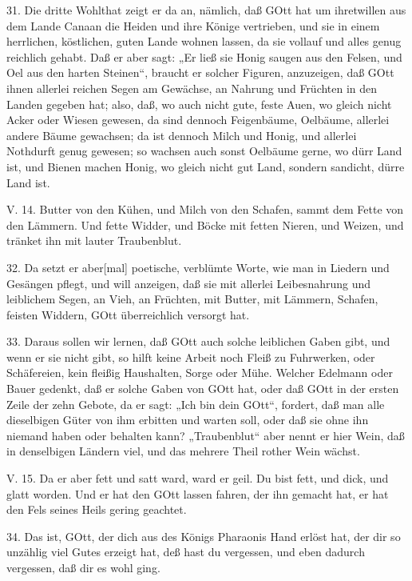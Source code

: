 31. Die dritte Wohlthat zeigt er da an, nämlich, daß GOtt hat um ihretwillen aus dem Lande Canaan die Heiden und ihre Könige vertrieben, und sie in einem herrlichen, köstlichen, guten Lande wohnen lassen, da sie vollauf und alles genug reichlich gehabt. Daß er aber sagt: „Er ließ sie Honig saugen aus den Felsen, und Oel aus den harten Steinen“, braucht er solcher Figuren, anzuzeigen, daß GOtt ihnen allerlei reichen Segen am Gewächse, an Nahrung und Früchten in den Landen gegeben hat; also, daß, wo auch nicht gute, feste Auen, wo gleich nicht Acker oder Wiesen gewesen, da sind dennoch Feigenbäume, Oelbäume, allerlei andere Bäume gewachsen; da ist dennoch Milch und Honig, und allerlei Nothdurft genug gewesen; so wachsen auch sonst Oelbäume gerne, wo dürr Land ist, und Bienen machen Honig, wo gleich nicht gut Land, sondern sandicht, dürre Land ist.

\begin{schriftzitat}
V. 14. Butter von den Kühen, und Milch von den Schafen, sammt dem Fette von den Lämmern. Und fette Widder, und Böcke mit fetten Nieren, und Weizen, und tränket ihn mit lauter Traubenblut.
\end{schriftzitat}

32. Da setzt er aber[mal] poetische, verblümte Worte, wie man in Liedern und Gesängen pflegt, und will anzeigen, daß sie mit allerlei Leibesnahrung
und leiblichem Segen, an Vieh, an Früchten, mit Butter, mit Lämmern, Schafen, feisten Widdern, GOtt überreichlich versorgt hat.

33. Daraus sollen wir lernen, daß GOtt auch solche leiblichen Gaben gibt, und wenn er sie nicht gibt, so hilft keine Arbeit noch Fleiß zu Fuhrwerken, oder Schäfereien, kein fleißig Haushalten, Sorge oder Mühe. Welcher Edelmann oder Bauer gedenkt, daß er solche Gaben von GOtt hat, oder daß GOtt in der ersten Zeile der zehn Gebote, da er sagt: „Ich bin dein GOtt“, fordert, daß man alle dieselbigen Güter von ihm erbitten und warten soll, oder daß sie ohne ihn niemand haben oder behalten kann? „Traubenblut“ aber nennt er hier Wein, daß in denselbigen Ländern viel, und das mehrere Theil rother Wein wächst.

\begin{schriftzitat}
V. 15. Da er aber fett und satt ward, ward er geil. Du bist fett, und dick, und glatt worden. Und er hat den GOtt lassen fahren, der ihn gemacht hat, er hat den Fels seines Heils gering geachtet.
\end{schriftzitat}

34. Das ist, GOtt, der dich aus des Königs Pharaonis Hand erlöst hat, der dir so unzählig viel Gutes erzeigt hat, deß hast du vergessen, und eben dadurch vergessen, daß dir es wohl ging.

